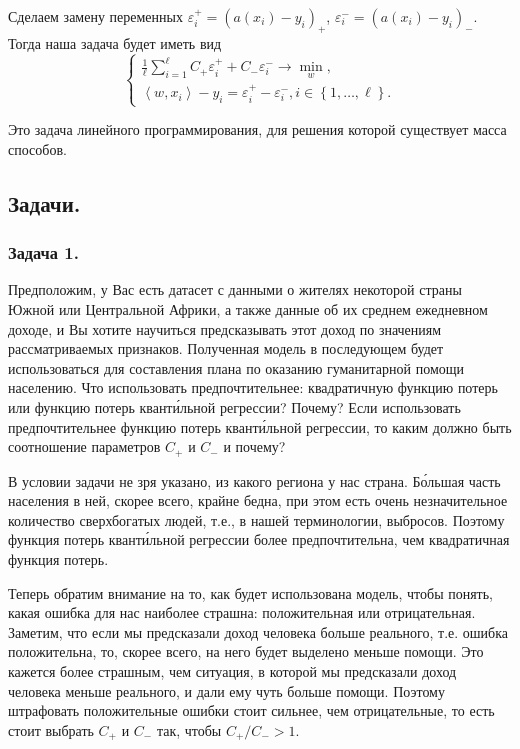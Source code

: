 Сделаем замену переменных $\varepsilon_i^+ = (a(x_i) - y_i)_+$, $\varepsilon_i^- = (a(x_i) - y_i)_-$. Тогда наша задача будет иметь вид
$$\begin{cases}
    \frac{1}{\ell}\sum_{i=1}^\ell C_+\varepsilon_i^+ + C_-\varepsilon_i^- \longrightarrow \min\limits_{w},\\
    \left\langle w, x_i \right\rangle - y_i = \varepsilon_i^+ - \varepsilon_i^-, i \in \left\{ 1 , \dotsc, \ell \right\}.
\end{cases}$$

Это задача линейного программирования, для решения которой существует масса способов.

\newpage

\subsection*{Задачи.}

\subsubsection*{Задача 1.}

Предположим, у Вас есть датасет с данными о жителях некоторой страны Южной или Центральной Африки, а также данные об их среднем ежедневном доходе, и Вы хотите научиться предсказывать этот доход по значениям рассматриваемых признаков. Полученная модель в последующем будет использоваться для составления плана по оказанию гуманитарной помощи населению. Что использовать предпочтительнее: квадратичную функцию потерь или функцию потерь квант\'{и}льной регрессии? Почему? Если использовать предпочтительнее функцию потерь квант\'{и}льной регрессии, то каким должно быть соотношение параметров $C_+$ и $C_-$ и почему?

\begin{solution}
    В условии задачи не зря указано, из какого региона у нас страна. Б\'{о}льшая часть населения в ней, скорее всего, крайне бедна, при этом есть очень незначительное количество сверхбогатых людей, т.е., в нашей терминологии, выбросов. Поэтому функция потерь квант\'{и}льной регрессии более предпочтительна, чем квадратичная функция потерь.

    Теперь обратим внимание на то, как будет использована модель, чтобы понять, какая ошибка для нас наиболее страшна: положительная или отрицательная. Заметим, что если мы предсказали доход человека больше реального, т.е. ошибка положительна, то, скорее всего, на него будет выделено меньше помощи. Это кажется более страшным, чем ситуация, в которой мы предсказали доход человека меньше реального, и дали ему чуть больше помощи. Поэтому штрафовать положительные ошибки стоит сильнее, чем отрицательные, то есть стоит выбрать $C_+$ и $C_-$ так, чтобы $C_+/C_- > 1$.
\end{solution}

